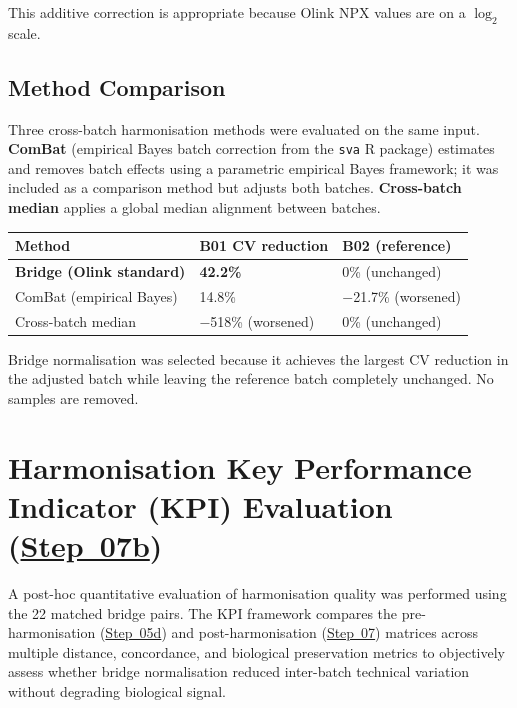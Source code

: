 \documentclass[11pt,a4paper]{article}
\begin{document}
This additive correction is appropriate because Olink NPX values are on a
$\log_{2}$ scale.

\subsection{Method Comparison}

Three cross-batch harmonisation methods were evaluated on the same input.
\textbf{ComBat} (empirical Bayes batch correction from the \texttt{sva} R
package) estimates and removes batch effects using a parametric empirical
Bayes framework; it was included as a comparison method but adjusts both
batches. \textbf{Cross-batch median} applies a global median alignment
between batches.

{\footnotesize
\renewcommand{\arraystretch}{1.2}
\begin{longtable}{p{4.5cm}p{3.5cm}p{4cm}}
\toprule
\textbf{Method} & \textbf{B01 CV reduction} & \textbf{B02 (reference)} \\
\midrule
\textbf{Bridge (Olink standard)} & \textbf{42.2\%} & 0\% (unchanged) \\
ComBat (empirical Bayes) & 14.8\% & $-$21.7\% (worsened) \\
Cross-batch median & $-$518\% (worsened) & 0\% (unchanged) \\
\bottomrule
\end{longtable}
\renewcommand{\arraystretch}{1.0}
}

Bridge normalisation was selected because it achieves the largest CV
reduction in the adjusted batch while leaving the reference batch completely
unchanged. No samples are removed.

\section{Harmonisation Key Performance Indicator (KPI) Evaluation (\href{https://github.com/FINNGEN/FinnGen3-proteomics-pipeline#pipeline-steps}{Step~07b})}

A post-hoc quantitative evaluation of harmonisation quality was performed
using the 22 matched bridge pairs. The KPI framework compares the
pre-harmonisation (\href{https://github.com/FINNGEN/FinnGen3-proteomics-pipeline#pipeline-steps}{Step~05d}) and post-harmonisation (\href{https://github.com/FINNGEN/FinnGen3-proteomics-pipeline#pipeline-steps}{Step~07}) matrices
across multiple distance, concordance, and biological preservation metrics
to objectively assess whether bridge normalisation reduced inter-batch
technical variation without degrading biological signal.
\end{document}
